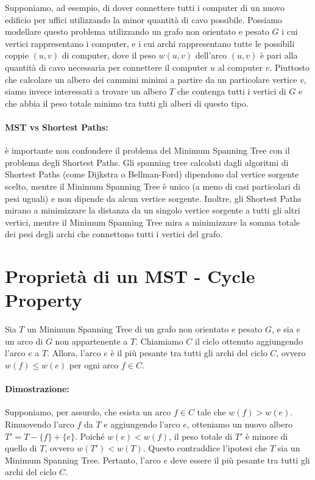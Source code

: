 Supponiamo, ad esempio, di dover connettere tutti i computer di un nuovo edificio per uffici utilizzando la minor quantità di cavo possibile. Possiamo modellare questo problema utilizzando un grafo non orientato e pesato $G$ i cui vertici rappresentano i computer, e i cui archi rappresentano tutte le possibili coppie $(u,v)$ di computer, dove il peso $w(u,v)$ dell'arco $(u,v)$ è pari alla quantità di cavo necessaria per connettere il computer $u$ al computer $v$. Piuttosto che calcolare un albero dei cammini minimi a partire da un particolare vertice $v$, siamo invece interessati a trovare un albero $T$ che contenga tutti i vertici di $G$ e che abbia il peso totale minimo tra tutti gli alberi di questo tipo. 

\paragraph{MST vs Shortest Paths:} è importante non confondere il problema del Minimum Spanning Tree con il problema degli Shortest Paths. Gli spanning tree calcolati dagli algoritmi di Shortest Paths (come Dijkstra o Bellman-Ford) dipendono dal vertice sorgente scelto, mentre il Minimum Spanning Tree è unico (a meno di casi particolari di pesi uguali) e non dipende da alcun vertice sorgente. Inoltre, gli Shortest Paths mirano a minimizzare la distanza da un singolo vertice sorgente a tutti gli altri vertici, mentre il Minimum Spanning Tree mira a minimizzare la somma totale dei pesi degli archi che connettono tutti i vertici del grafo.

\section*{Proprietà di un MST - Cycle Property}
Sia $T$ un Minimum Spanning Tree di un grafo non orientato e pesato $G$, e sia $e$ un arco di $G$ non appartenente a $T$. Chiamiamo $C$ il ciclo ottenuto aggiungendo l'arco $e$ a $T$. Allora, l'arco $e$ è il più pesante tra tutti gli archi del ciclo $C$, ovvero $w(f) \leq w(e)$ per ogni arco $f \in C$.

\paragraph{Dimostrazione:} 
Supponiamo, per assurdo, che esista un arco $f \in C$ tale che $w(f) > w(e)$. Rimuovendo l'arco $f$ da $T$ e aggiungendo l'arco $e$, otteniamo un nuovo albero $T' = T - \{f\} + \{e\}$. Poiché $w(e) < w(f)$, il peso totale di $T'$ è minore di quello di $T$, ovvero $w(T') < w(T)$. Questo contraddice l'ipotesi che $T$ sia un Minimum Spanning Tree. Pertanto, l'arco $e$ deve essere il più pesante tra tutti gli archi del ciclo $C$.

